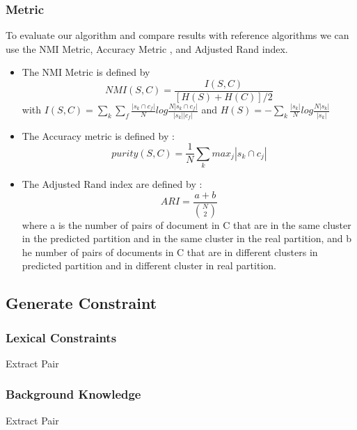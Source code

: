 \subsubsection{Metric}
To evaluate our algorithm and compare results with reference algorithms we can
use the NMI Metric\cite{measure}, Accuracy Metric \cite{measure}, and Adjusted
Rand index\cite{measure}. 
\begin{itemize}
\item The NMI Metric is defined by
$$
NMI(S,C) = \frac{I(S,C)}{[H(S)+H(C)]/2}
$$ 
with
$
I(S,C) =\sum_k \sum_f\frac{|s_k \cap c_f|}{N}log\frac{N|s_k \cap c_f|}{|s_k| |c_f|}
$ and $
H(S) = -\sum_k\frac{|s_k|}{N}log\frac{N|s_k|}{|s_k|}
$
\item The Accuracy metric is defined by :
$$
purity(S,C) = \frac{1}{N}\sum_k {max}_j|s_k \cap c_j|
$$
\item The Adjusted Rand index are defined by :
  $$ARI = \frac{a+b}{\binom{N}{2}}$$
  where a is the number of pairs of document in C
  that are in the same cluster in the predicted partition and in the
  same cluster in the real partition, and b he number of pairs of
  documents in C that are in different clusters in predicted partition
  and in different cluster in real partition.
\end{itemize}
\subsection{Generate Constraint}
\subsubsection{Lexical Constraints}
\begin{algorithm}
  \caption{Extract Pair}
\end{algorithm}
\subsubsection{Background Knowledge}
\begin{algorithm}
  \caption{Extract Pair}
\end{algorithm}
